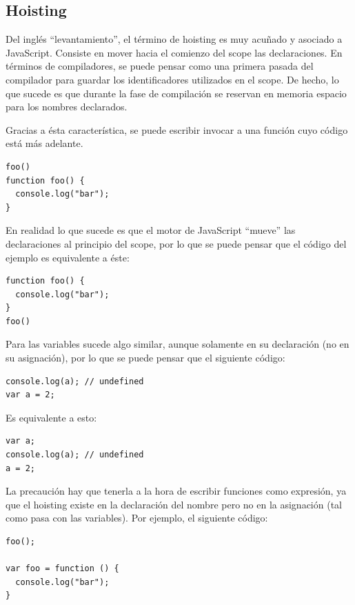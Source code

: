 \subsection{Hoisting}

Del inglés "`levantamiento"', el término de hoisting es muy acuñado y asociado a JavaScript. Consiste en mover hacia el comienzo del scope las declaraciones. En términos de compiladores, se puede pensar como una primera pasada del compilador para guardar los identificadores utilizados en el scope. De hecho, lo que sucede es que durante la fase de compilación se reservan en memoria espacio para los nombres declarados.

Gracias a ésta característica, se puede escribir invocar a una función cuyo código está más adelante.

\begin{lstlisting}
foo()
function foo() {
  console.log("bar");
}
\end{lstlisting}

En realidad lo que sucede es que el motor de JavaScript "`mueve"' las declaraciones al principio del scope, por lo que se puede pensar que el código del ejemplo es equivalente a éste:

\begin{lstlisting}
function foo() {
  console.log("bar");
}
foo()
\end{lstlisting}

Para las variables sucede algo similar, aunque solamente en su declaración (no en su asignación), por lo que se puede pensar que el siguiente código:

\begin{lstlisting}
console.log(a); // undefined
var a = 2;
\end{lstlisting}

Es equivalente a esto:

\begin{lstlisting}
var a;
console.log(a);	// undefined
a = 2;
\end{lstlisting}

La precaución hay que tenerla a la hora de escribir funciones como expresión, ya que el hoisting existe en la declaración del nombre pero no en la asignación (tal como pasa con las variables). Por ejemplo, el siguiente código:

\begin{lstlisting}
foo();

var foo = function () { 
  console.log("bar");
}
\end{lstlisting}

